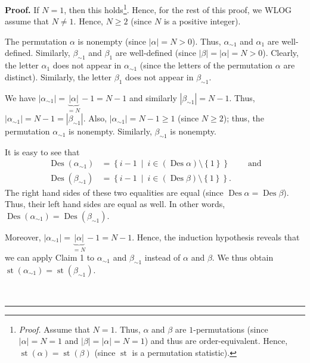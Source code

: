 \documentclass[numbers=enddot,12pt,final,onecolumn,notitlepage]{scrartcl}%
\theoremstyle{definition}
\newenvironment{proof}[1][Proof]{\noindent\textbf{#1.} }{\ \rule{0.5em}{0.5em}}
\newenvironment{verlong}{}{}
\begin{document}
\begin{verlong}
\begin{proof}
If $N=1$, then this holds\footnote{\textit{Proof.} Assume that $N=1$. Thus,
$\alpha$ and $\beta$ are $1$-permutations (since $\left\vert \alpha\right\vert
=N=1$ and $\left\vert \beta\right\vert =\left\vert \alpha\right\vert =N=1$)
and thus are order-equivalent. Hence, $\operatorname*{st}\left(
\alpha\right)  =\operatorname*{st}\left(  \beta\right)  $ (since
$\operatorname*{st}$ is a permutation statistic).}. Hence, for the rest of
this proof, we WLOG assume that $N\neq1$. Hence, $N\geq2$ (since $N$ is a
positive integer).

The permutation $\alpha$ is nonempty (since $\left\vert \alpha\right\vert
=N>0$). Thus, $\alpha_{\sim1}$ and $\alpha_{1}$ are well-defined. Similarly,
$\beta_{\sim1}$ and $\beta_{1}$ are well-defined (since $\left\vert
\beta\right\vert =\left\vert \alpha\right\vert =N>0$). Clearly, the letter
$\alpha_{1}$ does not appear in $\alpha_{\sim1}$ (since the letters of the
permutation $\alpha$ are distinct). Similarly, the letter $\beta_{1}$ does not
appear in $\beta_{\sim1}$.

We have $\left\vert \alpha_{\sim1}\right\vert =\underbrace{\left\vert
\alpha\right\vert }_{=N}-1=N-1$ and similarly $\left\vert \beta_{\sim
1}\right\vert =N-1$. Thus, $\left\vert \alpha_{\sim1}\right\vert
=N-1=\left\vert \beta_{\sim1}\right\vert $. Also, $\left\vert \alpha_{\sim
1}\right\vert =N-1\geq1$ (since $N\geq2$); thus, the permutation $\alpha
_{\sim1}$ is nonempty. Similarly, $\beta_{\sim1}$ is nonempty.

It is easy to see that
\begin{align*}
\operatorname*{Des}\left(  \alpha_{\sim1}\right)   &  =\left\{  i-1\ \mid
\ i\in\left(  \operatorname*{Des}\alpha\right)  \setminus\left\{  1\right\}
\right\}  \ \ \ \ \ \ \ \ \ \ \text{and}\\
\operatorname*{Des}\left(  \beta_{\sim1}\right)   &  =\left\{  i-1\ \mid
\ i\in\left(  \operatorname*{Des}\beta\right)  \setminus\left\{  1\right\}
\right\}  .
\end{align*}
The right hand sides of these two equalities are equal (since
$\operatorname*{Des}\alpha=\operatorname*{Des}\beta$). Thus, their left hand
sides are equal as well. In other words, $\operatorname*{Des}\left(
\alpha_{\sim1}\right)  =\operatorname*{Des}\left(  \beta_{\sim1}\right)  $.

Moreover, $\left\vert \alpha_{\sim1}\right\vert =\underbrace{\left\vert
\alpha\right\vert }_{=N}-1=N-1$. Hence, the induction hypothesis reveals that
we can apply Claim 1 to $\alpha_{\sim1}$ and $\beta_{\sim1}$ instead of
$\alpha$ and $\beta$. We thus obtain $\operatorname*{st}\left(  \alpha_{\sim
1}\right)  =\operatorname*{st}\left(  \beta_{\sim1}\right)  $.


\end{proof}
\end{verlong}
\end{document}
